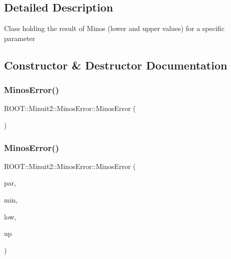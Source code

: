 \subsection{Detailed Description}
Class holding the result of Minos (lower and upper values) for a specific parameter 

\subsection{Constructor \& Destructor Documentation}
\mbox{\label{classROOT_1_1Minuit2_1_1MinosError_a5cb0fad5d73d20905a57fb1c505c9fd2}} 
\subsubsection{\texorpdfstring{MinosError()}{MinosError()}\hspace{0.1cm}{\footnotesize\ttfamily [1/9]}}
{\footnotesize\ttfamily R\+O\+O\+T\+::\+Minuit2\+::\+Minos\+Error\+::\+Minos\+Error (\begin{DoxyParamCaption}{ }\end{DoxyParamCaption})\hspace{0.3cm}{\ttfamily [inline]}}

\mbox{\label{classROOT_1_1Minuit2_1_1MinosError_a400609986f7b4e3a93eab1a35e1f33ce}} 
\subsubsection{\texorpdfstring{MinosError()}{MinosError()}\hspace{0.1cm}{\footnotesize\ttfamily [2/9]}}
{\footnotesize\ttfamily R\+O\+O\+T\+::\+Minuit2\+::\+Minos\+Error\+::\+Minos\+Error (\begin{DoxyParamCaption}\item[{unsigned int}]{par,  }\item[{double}]{min,  }\item[{const \mbox{\hyperlink{classROOT_1_1Minuit2_1_1MnCross}{Mn\+Cross}} \&}]{low,  }\item[{const \mbox{\hyperlink{classROOT_1_1Minuit2_1_1MnCross}{Mn\+Cross}} \&}]{up }\end{DoxyParamCaption})\hspace{0.3cm}{\ttfamily [inline]}}

